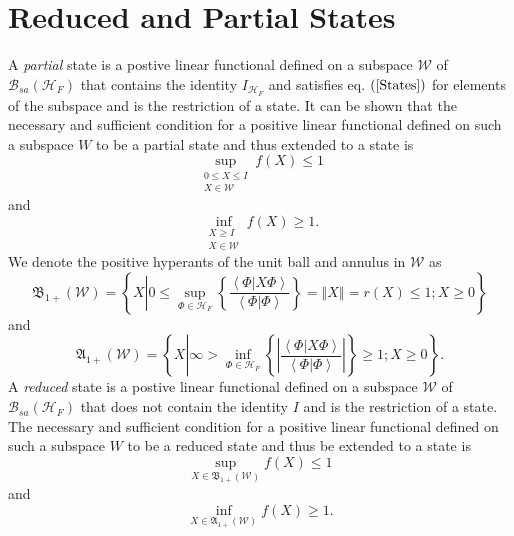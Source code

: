 \documentclass[aps,preprint]{revtex4}%
\begin{document}
\section{Reduced and Partial States}

A \emph{partial} state is a postive linear functional defined on a subspace
$\mathcal{W}$ of $\mathcal{B}_{sa}\left(  \mathcal{H}_{F}\right)  $ that
contains the identity $I_{\mathcal{H}_{F}}$ and satisfies eq. $\left(
\ref{States}\right)  $ for elements of the subspace and is the restriction of
a state. It can be shown \cite{Emch} that the necessary and sufficient
condition for a positive linear functional defined on such a subspace $W$ to
be a partial state and thus extended to a state is
\begin{equation}
\sup_{\substack{0\leq X\leq I\\X\in\mathcal{W}}}f\left(  X\right)  \leq1
\label{LessI}%
\end{equation}
and%
\begin{equation}
\inf_{\substack{X\geq I\\X\in\mathcal{W}}}f\left(  X\right)  \geq1.
\label{MoreI}%
\end{equation}
We denote the positive hyperants of the unit ball and annulus in $\mathcal{W}$
as
\begin{equation}
\mathfrak{B}_{1+}\left(  \mathcal{W}\right)  =\left\{  X\left\vert 0\leq
\sup_{\Phi\in\mathcal{H}_{F}}\left\{  \frac{\left\langle \left.
\Phi\right\vert X\Phi\right\rangle }{\left\langle \left.  \Phi\right\vert
\Phi\right\rangle }\right\}  =\left\Vert X\right\Vert =r\left(  X\right)
\leq1;X\geq0\right.  \right\}
\end{equation}
and
\begin{equation}
\mathfrak{A}_{1+}\left(  \mathcal{W}\right)  =\left\{  X\left\vert \infty
>\inf_{\Phi\in\mathcal{H}_{F}}\left\{  \left\vert \frac{\left\langle \left.
\Phi\right\vert X\Phi\right\rangle }{\left\langle \left.  \Phi\right\vert
\Phi\right\rangle }\right\vert \right\}  \geq1;X\geq0\right.  \right\}  .
\end{equation}
A \emph{reduced} state is a postive linear functional defined on a subspace
$\mathcal{W}$ of $\mathcal{B}_{sa}\left(  \mathcal{H}_{F}\right)  $ that does
not contain the identity $I$ and is the restriction of a state. The necessary
and sufficient condition for a positive linear functional defined on such a
subspace $W$ to be a reduced state and thus be extended to a state is
\begin{equation}
\sup_{X\in\mathfrak{B}_{1+}\left(  \mathcal{W}\right)  }f\left(  X\right)
\leq1
\end{equation}
and%
\begin{equation}
\inf_{X\in\mathfrak{A}_{1+}\left(  \mathcal{W}\right)  }f\left(  X\right)
\geq1.
\end{equation}
\end{document}
